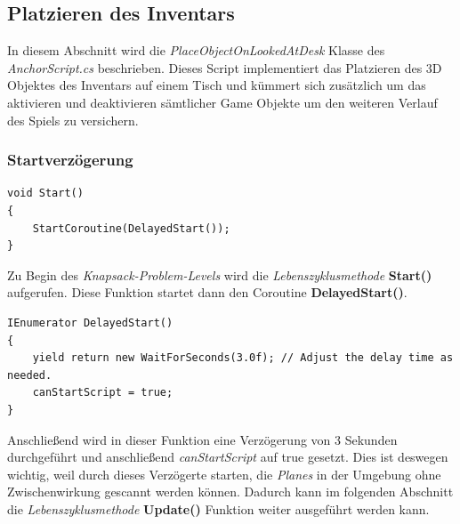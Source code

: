 \subsection{Platzieren des Inventars}
In diesem Abschnitt wird die \textit{PlaceObjectOnLookedAtDesk} Klasse des \textit{AnchorScript.cs} beschrieben. Dieses Script
implementiert das Platzieren des 3D Objektes des Inventars auf einem Tisch und kümmert sich zusätzlich
um das aktivieren und deaktivieren sämtlicher Game Objekte um den weiteren Verlauf des Spiels zu versichern.

\subsubsection{Startverzögerung}
\begin{lstlisting}[style=csharp, caption={}, label=code:Start]
void Start()
{
    StartCoroutine(DelayedStart());
}
\end{lstlisting}
Zu Begin des \textit{Knapsack-Problem-Levels} wird die \textit{Lebenszyklusmethode} \textbf{Start()} aufgerufen. Diese
Funktion startet dann den Coroutine \textbf{DelayedStart()}.\\

\begin{lstlisting}[style=csharp, caption={}, label=code:DelayedStart]
IEnumerator DelayedStart()
{
    yield return new WaitForSeconds(3.0f); // Adjust the delay time as needed.
    canStartScript = true;
}
\end{lstlisting}
Anschließend wird in dieser Funktion eine Verzögerung von 3 Sekunden durchgeführt und anschließend \textit{canStartScript}
auf true gesetzt. Dies ist deswegen wichtig, weil durch dieses Verzögerte starten, die \textit{Planes} in der Umgebung ohne
Zwischenwirkung gescannt werden können. Dadurch kann im folgenden Abschnitt die \textit{Lebenszyklusmethode} \textbf{Update()}
Funktion weiter ausgeführt werden kann.


